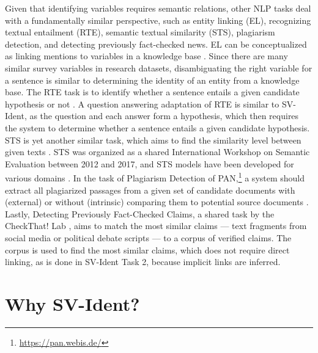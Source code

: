 \documentclass[11pt]{article}
\begin{document}
Given that identifying variables requires semantic relations, other NLP tasks deal with a fundamentally similar perspective, such as entity linking (EL), recognizing textual entailment (RTE), semantic textual similarity (STS), plagiarism detection, and detecting previously fact-checked news.
EL can be conceptualized as linking mentions to variables in a knowledge base \cite{rao2013entity}.
Since there are many similar survey variables in research datasets, disambiguating the right variable for a sentence is similar to determining the identity of an entity from a knowledge base.
The RTE task is to identify whether a sentence entails a given candidate hypothesis or not \cite{dzikovska-etal-2013-semeval}.
A question answering adaptation of RTE \cite{dagan2013recognizing} is similar to SV-Ident, as the question and each answer form a hypothesis, which then requires the system to determine whether a sentence entails a given candidate hypothesis.
STS is yet another similar task, which aims to find the similarity level between given texts \cite{agirre-etal-2013-sem}.
STS was organized as a shared International Workshop on Semantic Evaluation between 2012 and 2017, and STS models have been developed for various domains \cite{wang2020medsts,yang2020measurement,guo2020cord19sts}.
In the task of Plagiarism Detection of PAN,\footnote{\url{https://pan.webis.de/}} a system should extract all plagiarized passages from a given set of candidate documents with (external) or without (intrinsic) comparing them to potential source documents \cite{potthast2013overview}.
Lastly, Detecting Previously Fact-Checked Claims, a shared task by the CheckThat! Lab \cite{nakov2022overview}, aims to match the most similar claims --- text fragments from social media or political debate scripts --- to a corpus of verified claims.
The corpus is used to find the most similar claims, which does not require direct linking, as is done in SV-Ident Task 2, because implicit links are inferred.







\section{Why SV-Ident?}
\label{sec:why-sv-ident}
\end{document}
